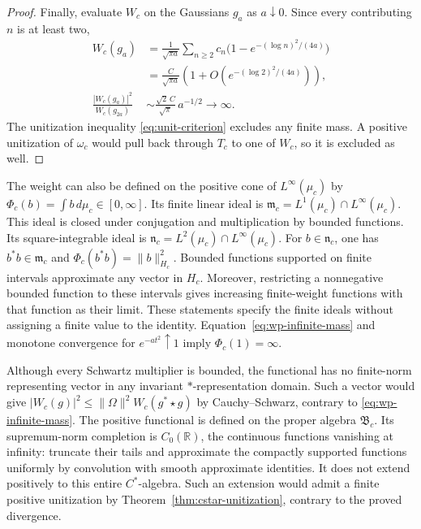 \documentclass[11pt]{article}
\theoremstyle{definition}
\theoremstyle{remark}
\numberwithin{equation}{section}
\newcommand{\R}{\mathbb R}
\begin{document}
\begin{proof}
Finally, evaluate $W_c$ on the Gaussians $g_a$ as $a\downarrow0$.
Since every contributing $n$ is at least two,
\begin{equation}
 \begin{aligned}
 W_c(g_a)&=\frac1{\sqrt{\pi a}}
       \sum_{n\geq2}c_n\bigl(1-e^{-(\log n)^2/(4a)}\bigr)\\
 &=\frac{C}{\sqrt{\pi a}}
       \left(1+O\left(e^{-(\log2)^2/(4a)}\right)\right),\\
 \frac{|W_c(g_a)|^2}{W_c(g_{2a})}
 &\sim\frac{\sqrt2\,C}{\sqrt\pi}\,a^{-1/2}\longrightarrow\infty.
 \end{aligned}
 \label{eq:wp-infinite-mass}
\end{equation}
The unitization inequality \eqref{eq:unit-criterion} excludes any finite mass.
A positive unitization of $\omega_c$ would pull back through $T_c$
to one of $W_c$, so it is excluded as well.
\end{proof}

The weight can also be defined on the positive cone of $L^\infty(\mu_c)$
by $\Phi_c(b)=\int b\,d\mu_c\in[0,\infty]$.
Its finite linear ideal is
$\mathfrak m_c=L^1(\mu_c)\cap L^\infty(\mu_c)$.
This ideal is closed under conjugation and multiplication by bounded functions.
Its square-integrable ideal is
$\mathfrak n_c=L^2(\mu_c)\cap L^\infty(\mu_c)$.
For $b\in\mathfrak n_c$, one has $b^*b\in\mathfrak m_c$ and
$\Phi_c(b^*b)=\|b\|_{H_c}^2$.
Bounded functions supported on finite intervals approximate any vector
in $H_c$.
Moreover, restricting a nonnegative bounded function to these intervals
gives increasing finite-weight functions with that function as their limit.
These statements specify the finite ideals without assigning a finite
value to the identity.
Equation~\eqref{eq:wp-infinite-mass} and monotone convergence for
$e^{-at^2}\uparrow1$ imply $\Phi_c(1)=\infty$.

Although every Schwartz multiplier is bounded, the functional has no
finite-norm representing vector in any invariant $*$-representation domain.
Such a vector would give
$|W_c(g)|^2\leq\|\Omega\|^2W_c(g^*\star g)$ by Cauchy--Schwarz,
contrary to \eqref{eq:wp-infinite-mass}.
The positive functional is defined on the proper algebra $\mathfrak B_c$.
Its supremum-norm completion is $C_0(\R)$, the continuous functions
vanishing at infinity: truncate their tails and approximate the compactly
supported functions uniformly by convolution with smooth approximate identities.
It does not extend positively to this entire $C^*$-algebra.
Such an extension would admit a finite positive unitization by
Theorem~\ref{thm:cstar-unitization}, contrary to the proved divergence.
\end{document}
